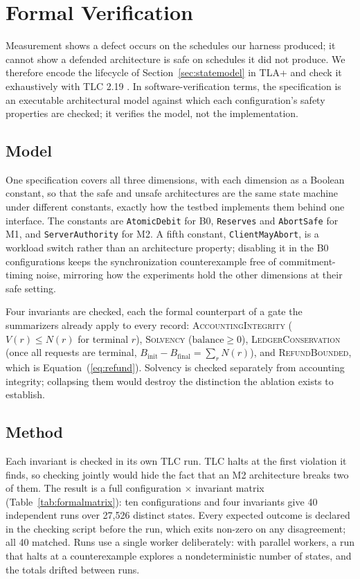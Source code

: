 \documentclass[manuscript,review,anonymous]{acmart}
\begin{document}
\section{Formal Verification}
\label{sec:formal}
Measurement shows a defect occurs on the schedules our harness produced; it cannot show a
defended architecture is safe on schedules it did not produce. We therefore encode the
lifecycle of Section~\ref{sec:statemodel} in TLA+ \citep{tla} and check it exhaustively
with TLC 2.19 \citep{tlc}. In software-verification terms, the specification is an
executable architectural model against which each configuration's safety properties are
checked; it verifies the model, not the implementation.

\subsection{Model}
One specification covers all three dimensions, with each dimension as a Boolean constant,
so that the safe and unsafe architectures are the same state machine under different
constants, exactly how the testbed implements them behind one interface. The constants
are \texttt{AtomicDebit} for B0, \texttt{Reserves} and \texttt{AbortSafe} for M1, and
\texttt{ServerAuthority} for M2. A fifth constant, \texttt{ClientMayAbort}, is a workload
switch rather than an architecture property; disabling it in the B0 configurations keeps
the synchronization counterexample free of commitment-timing noise, mirroring how the
experiments hold the other dimensions at their safe setting.

Four invariants are checked, each the formal counterpart of a gate the summarizers
already apply to every record: \textsc{AccountingIntegrity} ($V(r) \le N(r)$ for terminal
$r$), \textsc{Solvency} ($\mathrm{balance} \ge 0$), \textsc{LedgerConservation} (once all
requests are terminal, $B_{\mathrm{init}} - B_{\mathrm{final}} = \sum_r N(r)$), and
\textsc{RefundBounded}, which is Equation~(\ref{eq:refund}). Solvency is checked
separately from accounting integrity; collapsing them would destroy the distinction the
ablation exists to establish.

\subsection{Method}
Each invariant is checked in its own TLC run. TLC halts at the first violation it finds,
so checking jointly would hide the fact that an M2 architecture breaks two of them. The
result is a full configuration $\times$ invariant matrix (Table~\ref{tab:formalmatrix}):
ten configurations and four invariants give 40 independent runs over 27{,}526 distinct
states. Every expected outcome is declared in the checking script before the run, which exits
non-zero on any disagreement; all 40 matched. Runs
use a single worker deliberately: with parallel workers, a run that halts at a
counterexample explores a nondeterministic number of states, and the totals drifted
between runs.
\end{document}
